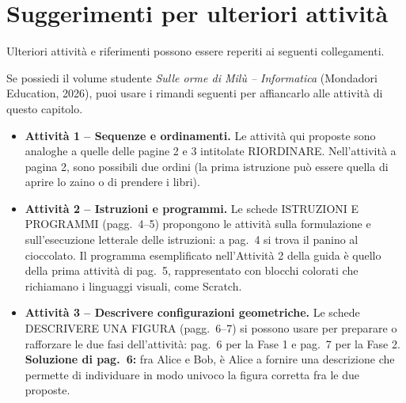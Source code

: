 \section{Suggerimenti per ulteriori attività}\label{suggerimenti-per-ulteriori-attivituxe0-e-riferimenti}

Ulteriori attività e riferimenti possono essere reperiti ai seguenti collegamenti.

\printbibliography[heading=none,keyword={cap3},category={attivita}]

\begin{rimandiquaderno}
Se possiedi il volume studente \emph{Sulle orme di Milù -- Informatica}
(Mondadori Education, 2026), puoi usare i rimandi seguenti per affiancarlo
alle attività di questo capitolo.\par\smallskip

\begin{itemize}[leftmargin=*,itemsep=5pt,topsep=4pt]
\item \textbf{Attività 1 -- Sequenze e ordinamenti.} Le attività qui proposte sono analoghe a quelle delle pagine 2 e 3 intitolate RIORDINARE. Nell'attività a pagina 2, sono possibili due ordini (la prima istruzione può essere quella di aprire lo zaino o di prendere i libri).
\item \textbf{Attività 2 -- Istruzioni e programmi.} Le schede ISTRUZIONI E PROGRAMMI (pagg.~4--5) propongono le attività sulla formulazione e sull'esecuzione letterale delle istruzioni: a pag.~4 si trova il panino al cioccolato. Il programma esemplificato nell'Attività 2 della guida è quello della prima attività di pag.~5, rappresentato con blocchi colorati che richiamano i linguaggi visuali, come Scratch.
\item \textbf{Attività 3 -- Descrivere configurazioni geometriche.} Le schede DESCRIVERE UNA FIGURA (pagg.~6--7) si possono usare per preparare o rafforzare le due fasi dell'attività: pag.~6 per la Fase 1 e pag.~7 per la Fase 2. \textbf{Soluzione di pag.~6:} fra Alice e Bob, è Alice a fornire una descrizione che permette di individuare in modo univoco la figura corretta fra le due proposte.
\end{itemize}
\end{rimandiquaderno}
